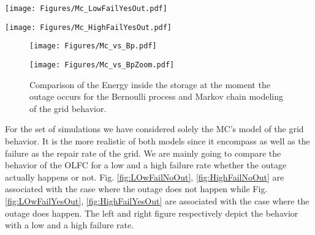 \documentclass[conference]{IEEEtran}
\begin{document}
\begin{figure*}[!ht]
    \begin{minipage}{.49\linewidth}
        \texttt{[image: Figures/Mc\_LowFailYesOut.pdf]}
        \caption{Low prob of failure, with outage}
        \label{fig:LOwFailYesOut}    
    \end{minipage}%
    \begin{minipage}{.01\linewidth}
      \hspace{1px}
    \end{minipage}%
    \begin{minipage}{0.49\linewidth}
        \texttt{[image: Figures/Mc\_HighFailYesOut.pdf]} 
        \caption{High prob of failure, with outage}
        \label{fig:HighFailYesOut}
    \end{minipage}
\end{figure*}

 \begin{figure}[!htb]
        \begin{center}
                \texttt{[image: Figures/Mc\_vs\_Bp.pdf]}
        \end{center}
                \vspace{-8px}

        \begin{center}
                \texttt{[image: Figures/Mc\_vs\_BpZoom.pdf]}
        \end{center}
        \vspace{-8px}
        \caption{Comparison of the Energy inside the storage at the moment the outage occurs for the Bernoulli process and  Markov chain modeling of the grid behavior.
        }
        \label{fig:BernouVsMar}
\end{figure} 
  For the set of simulations we have considered solely the MC's model of the grid behavior. It is the more realistic of both models since it encompass as well as the failure as the repair rate of the grid. We are mainly going to compare the behavior of the OLFC for a low and a high failure rate whether the outage actually happens or not. Fig. \ref{fig:LOwFailNoOut}, \ref{fig:HighFailNoOut} are associated with the case where the outage does not happen while Fig. \ref{fig:LOwFailYesOut}, \ref{fig:HighFailYesOut} are associated with the case where the outage does happen. The left and right figure respectively depict the behavior with a low and a high failure rate. 
  
\end{document}
